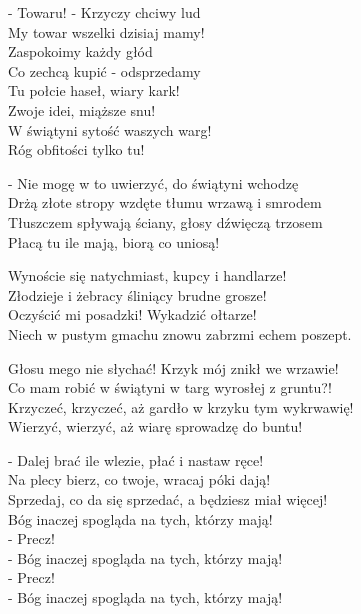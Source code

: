 \begin{text}
    - Towaru! - Krzyczy chciwy lud\\
    My towar wszelki dzisiaj mamy!\\
    Zaspokoimy każdy głód\\
    Co zechcą kupić - odsprzedamy\\
    Tu połcie haseł, wiary kark!\\
    Zwoje idei, miąższe snu!\\
    W świątyni sytość waszych warg!\\
    Róg obfitości tylko tu!

    - Nie mogę w to uwierzyć, do świątyni wchodzę\\
    Drżą złote stropy wzdęte tłumu wrzawą i smrodem\\
    Tłuszczem spływają ściany, głosy dźwięczą trzosem\\
    Płacą tu ile mają, biorą co uniosą!

    Wynoście się natychmiast, kupcy i handlarze!\\
    Złodzieje i żebracy śliniący brudne grosze!\\
    Oczyścić mi posadzki! Wykadzić ołtarze!\\
    Niech w pustym gmachu znowu zabrzmi echem poszept.

    Głosu mego nie słychać! Krzyk mój znikł we wrzawie!\\
    Co mam robić w świątyni w targ wyrosłej z gruntu?!\\
    Krzyczeć, krzyczeć, aż gardło w krzyku tym wykrwawię!\\
    Wierzyć, wierzyć, aż wiarę sprowadzę do buntu!

    - Dalej brać ile wlezie, płać i nastaw ręce!\\
    Na plecy bierz, co twoje, wracaj póki dają!\\
    Sprzedaj, co da się sprzedać, a będziesz miał więcej!\\
    Bóg inaczej spogląda na tych, którzy mają!\\
    - Precz!\\
    - Bóg inaczej spogląda na tych, którzy mają!\\
    - Precz!\\
    - Bóg inaczej spogląda na tych, którzy mają!
\end{text}
